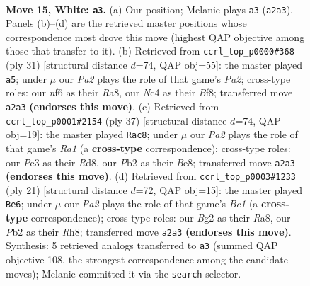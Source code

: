 \documentclass[11pt]{article}
\begin{document}
\clearpage

\begin{figure}[p]\centering
\begin{subfigure}{0.46\textwidth}\centering
\resizebox{\linewidth}{!}{%
\newchessgame
\chessboard[
  setfen={r1b2rk1/1p1n1p2/4pnp1/2b4p/p1N2B2/4P1P1/PP3PBP/RN1R2K1 w - - 0 15},
  showmover=false,
  pgfstyle=straightmove, color=movearrow, markmove={a2-a3}
]}
\caption{}
\end{subfigure}\hfill
\begin{subfigure}{0.46\textwidth}\centering
\resizebox{\linewidth}{!}{%
\newchessgame
\chessboard[
  setfen={r3kb1r/pp1npp2/2p1b1p1/6Pp/Pn1PB3/2N2P2/1PPBN2P/R3K2R b KQkq - 2 16},
  showmover=false,
  pgfstyle=straightmove, color=movearrow, markmove={a7-a5}
]}
\caption{}
\end{subfigure}
\\[4pt]
\begin{subfigure}{0.46\textwidth}\centering
\resizebox{\linewidth}{!}{%
\newchessgame
\chessboard[
  setfen={r2rb1k1/1p2nppp/p3pn2/P1b5/8/2P1NNP1/1P2BP1P/R2RB1K1 b - - 2 19},
  showmover=false,
  pgfstyle=straightmove, color=movearrow, markmove={a8-c8}
]}
\caption{}
\end{subfigure}\hfill
\begin{subfigure}{0.46\textwidth}\centering
\resizebox{\linewidth}{!}{%
\newchessgame
\chessboard[
  setfen={r1b1k2r/1pp2ppp/2n2n2/p4p2/1b1P4/5NP1/PP1BPPBP/RN3RK1 b kq - 1 11},
  showmover=false,
  pgfstyle=straightmove, color=movearrow, markmove={c8-e6}
]}
\caption{}
\end{subfigure}
\caption{\textbf{Move 15, White: \texttt{a3}.} (a) Our position; Melanie plays \texttt{a3} (\texttt{a2a3}). Panels (b)--(d) are the retrieved master positions whose correspondence most drove this move (highest QAP objective among those that transfer to it). (b) Retrieved from \texttt{ccrl\_top\_p0000\#368} (ply 31) [structural distance $d$=74, QAP obj=55]: the master played \texttt{a5}; under $\mu$ our \emph{Pa2} plays the role of that game's \emph{Pa2}; cross-type roles: our \emph{n}f6 as their \emph{R}a8, our \emph{N}c4 as their \emph{B}f8; transferred move \texttt{a2a3} \textbf{(endorses this move)}. (c) Retrieved from \texttt{ccrl\_top\_p0001\#2154} (ply 37) [structural distance $d$=74, QAP obj=19]: the master played \texttt{Rac8}; under $\mu$ our \emph{Pa2} plays the role of that game's \emph{Ra1} (a \textbf{cross-type} correspondence); cross-type roles: our \emph{P}e3 as their \emph{R}d8, our \emph{P}b2 as their \emph{B}e8; transferred move \texttt{a2a3} \textbf{(endorses this move)}. (d) Retrieved from \texttt{ccrl\_top\_p0003\#1233} (ply 21) [structural distance $d$=72, QAP obj=15]: the master played \texttt{Be6}; under $\mu$ our \emph{Pa2} plays the role of that game's \emph{Bc1} (a \textbf{cross-type} correspondence); cross-type roles: our \emph{B}g2 as their \emph{R}a8, our \emph{P}b2 as their \emph{R}h8; transferred move \texttt{a2a3} \textbf{(endorses this move)}. Synthesis: 5 retrieved analogs transferred to \texttt{a3} (summed QAP objective 108, the strongest correspondence among the candidate moves); Melanie committed it via the \texttt{search} selector.}
\label{fig:thought-m28}
\end{figure}
\end{document}
